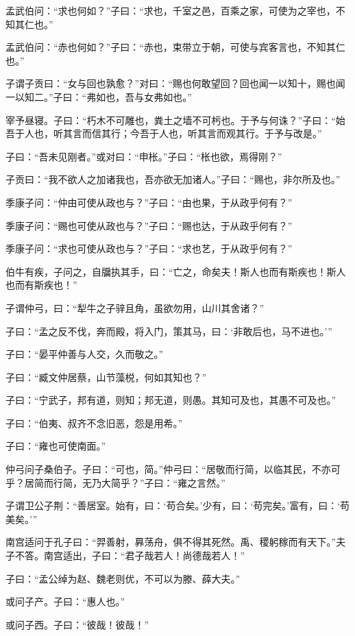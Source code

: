 \documentclass[a5paper]{ctexbook}
\begin{document}
    孟武伯问：“求也何如？”子曰：“求也，千室之邑，百乘之家，可使为之宰也，不知其仁也。”
    
    孟武伯问：“赤也何如？”子曰：“赤也，束带立于朝，可使与宾客言也，不知其仁也。”

    子谓子贡曰：“女与回也孰愈？”对曰：“赐也何敢望回？回也闻一以知十，赐也闻一以知二。”子曰：“弗如也，吾与女弗如也。”

    宰予昼寝。子曰：“朽木不可雕也，粪土之墙不可杇也。于予与何诛？”子曰：“始吾于人也，听其言而信其行；今吾于人也，听其言而观其行。于予与改是。”

    子曰：“吾未见刚者。”或对曰：“申枨。”子曰：“枨也欲，焉得刚？”

    子贡曰：“我不欲人之加诸我也，吾亦欲无加诸人。”子曰：“赐也，非尔所及也。”

    季康子问：“仲由可使从政也与？”子曰：“由也果，于从政乎何有？”
    
    季康子问：“赐也可使从政也与？”子曰：“赐也达，于从政乎何有？”
    
    季康子问：“求也可使从政也与？”子曰：“求也艺，于从政乎何有？”

    伯牛有疾，子问之，自牖执其手，曰：“亡之，命矣夫！斯人也而有斯疾也！斯人也而有斯疾也！”

    子谓仲弓，曰：“犁牛之子骍且角，虽欲勿用，山川其舍诸？”

    子曰：“孟之反不伐，奔而殿，将入门，策其马，曰：‘非敢后也，马不进也。’”

    子曰：“晏平仲善与人交，久而敬之。”

    子曰：“臧文仲居蔡，山节藻棁，何如其知也？”

    子曰：“宁武子，邦有道，则知；邦无道，则愚。其知可及也，其愚不可及也。”

    子曰：“伯夷、叔齐不念旧恶，怨是用希。”

    子曰：“雍也可使南面。”

    仲弓问子桑伯子。子曰：“可也，简。”仲弓曰：“居敬而行简，以临其民，不亦可乎？居简而行简，无乃大简乎？”子曰：“雍之言然。”

    子谓卫公子荆：“善居室。始有，曰：‘苟合矣。’少有，曰：‘苟完矣。’富有，曰：‘苟美矣。’”

    南宫适问于孔子曰：“羿善射，奡荡舟，俱不得其死然。禹、稷躬稼而有天下。”夫子不答。南宫适出，子曰：“君子哉若人！尚德哉若人！”

    子曰：“孟公绰为赵、魏老则优，不可以为滕、薛大夫。”

    或问子产。子曰：“惠人也。”
    
    或问子西。子曰：“彼哉！彼哉！”
\end{document}
